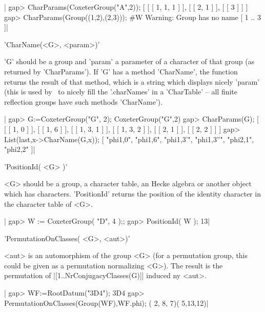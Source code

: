 |    gap> CharParams(CoxeterGroup("A",2));
    [ [ [ 1, 1, 1 ] ], [ [ 2, 1 ] ], [ [ 3 ] ] ]
    gap> CharParams(Group((1,2),(2,3)));
    #W  Warning: Group has no name
    [ 1 .. 3 ]|

%
%

'CharName(<G>, <param>)'

'G' should  be a group  and 'param' a parameter  of a character  of that
group (as returned by 'CharParams'). If 'G' has a method 'CharName', the
function returns  the result  of that  method, which  is a  string which
displays nicely  'param' (this is  used by  \CHEVIE\ to nicely  fill the
'.charNames' in a 'CharTable' --  all finite reflection groups have such
methods 'CharName').

|    gap> G:=CoxeterGroup("G", 2);
    CoxeterGroup("G",2)
    gap> CharParams(G);
    [ [ [ 1, 0 ] ], [ [ 1, 6 ] ], [ [ 1, 3, 1 ] ], [ [ 1, 3, 2 ] ],
      [ [ 2, 1 ] ], [ [ 2, 2 ] ] ]
    gap>  List(last,x->CharName(G,x));
    [ "phi{1,0}", "phi{1,6}", "phi{1,3}'", "phi{1,3}''", "phi{2,1}",
      "phi{2,2}" ]|


'PositionId( <G> )'

<G>  should be  a group,  a character  table, an  Hecke algebra  or another
object  which  has  characters.  'PositionId'  returns  the position of the
identity character in the character table of <G>.

|    gap> W := CoxeterGroup( "D", 4 );;
    gap> PositionId( W );
    13|


'PermutationOnClasses( <G>, <aut>)'

<aut>  is an automorphism of  the group <G> (for  a permutation group, this
could  be  given  as  a  permutation  normalizing  <G>).  The result is the
permutation of |[1..NrConjugacyClasses(G)]| induced ny <aut>.

|    gap> WF:=RootDatum("3D4");                     
    3D4
    gap> PermutationOnClasses(Group(WF),WF.phi);
    ( 2, 8, 7)( 5,13,12)|


